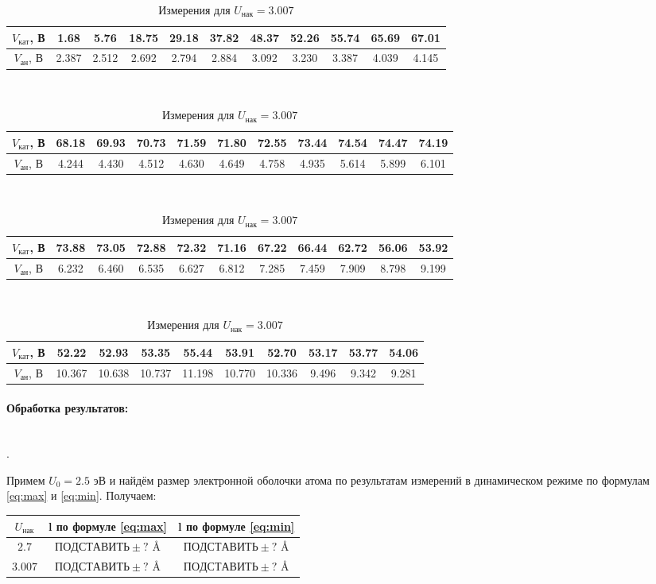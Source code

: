 \documentclass[a4paper, 12pt]{article}
\newcommand{\parag}[1]{\paragraph*{#1:}}
\newcounter{Points}
\newcommand{\point}{\arabic{Points}. \addtocounter{Points}{1}}
\begin{document}
\begin{table}[!h]
    \centering
    \begin{tabular}{|c|c|c|c|c|c|c|c|c|c|c|}
        \hline
        $V_{кат}$, В & 1.68 & 5.76 & 18.75 & 29.18 & 37.82 & 48.37 & 52.26 & 55.74 & 65.69 & 67.01 \\ \hline
        $V_{ан}$, В &  2.387 & 2.512 & 2.692 & 2.794 & 2.884 & 3.092 & 3.230 & 3.387 & 4.039 & 4.145 \\ \hline
    \end{tabular}
    ~\\
    \begin{tabular}{|c|c|c|c|c|c|c|c|c|c|c|}
        \hline
        $V_{кат}$, В & 68.18 & 69.93 & 70.73 & 71.59 & 71.80 & 72.55 & 73.44 & 74.54 & 74.47 & 74.19 \\ \hline
        $V_{ан}$, В &  4.244 & 4.430 & 4.512 & 4.630 & 4.649 & 4.758 & 4.935 & 5.614 & 5.899 & 6.101 \\ \hline
    \end{tabular}
    ~\\
    \begin{tabular}{|c|c|c|c|c|c|c|c|c|c|c|}
        \hline
        $V_{кат}$, В &  73.88 & 73.05 & 72.88 & 72.32 & 71.16 & 67.22 & 66.44 & 62.72 & 56.06 & 53.92 \\ \hline
        $V_{ан}$, В &  6.232 & 6.460 & 6.535 & 6.627 & 6.812 & 7.285 & 7.459 & 7.909 & 8.798 & 9.199 \\ \hline
    \end{tabular}
    ~\\
    \begin{tabular}{|c|c|c|c|c|c|c|c|c|c|}
        \hline
        $V_{кат}$, В &  52.22 & 52.93 & 53.35 & 55.44 & 53.91 & 52.70 & 53.17 & 53.77 & 54.06 \\ \hline
        $V_{ан}$, В &  10.367 & 10.638 & 10.737 & 11.198 & 10.770 & 10.336 & 9.496 & 9.342 & 9.281 \\ \hline
    \end{tabular}
    \caption {Измерения для $U_{нак} = 3.007$}
    \label{tab:stat2}
\end{table}

\parag {Обработка результатов} ~\\
\point Примем $U_0 = 2.5$ эВ и найдём размер электронной оболочки атома по результатам измерений в динамическом режиме по формулам \eqref{eq:max} и \eqref{eq:min}. Получаем:

\begin{table}[!h]
    \centering
    \begin{tabular}{|c|c|c|}
        \hline
        $U_{нак}$ & l по формуле \eqref{eq:max} & l по формуле \eqref{eq:min} \\ \hline
        $2.7$ & $ПОДСТАВИТЬ \pm ?$ \AA & $ПОДСТАВИТЬ \pm ?$ \AA \\ \hline
        $3.007$ & $ПОДСТАВИТЬ \pm ?$ \AA & $ПОДСТАВИТЬ \pm ?$ \AA \\ \hline
    \end{tabular}
\end{table}
\end{document}
